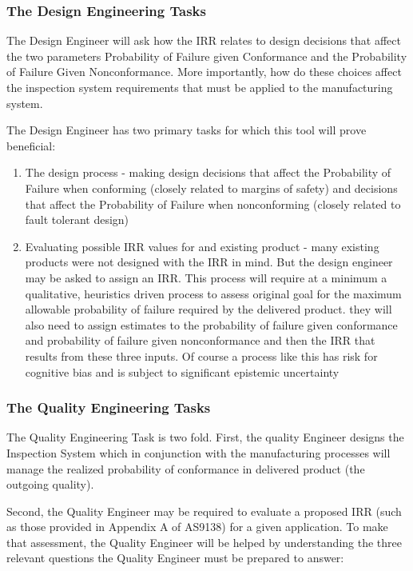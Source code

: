 \documentclass[
]{article}
\providecommand{\tightlist}{%
  \setlength{\itemsep}{0pt}\setlength{\parskip}{0pt}}
\begin{document}
\subsubsection{The Design Engineering Tasks}\label{the-design-engineering-tasks}

The Design Engineer will ask how the IRR relates to design decisions that affect the two parameters Probability of Failure given Conformance and the Probability of Failure Given Nonconformance. More importantly, how do these choices affect the inspection system requirements that must be applied to the manufacturing system.

The Design Engineer has two primary tasks for which this tool will prove beneficial:

\begin{enumerate}
\def\labelenumi{\arabic{enumi}.}
\tightlist
\item
  The design process - making design decisions that affect the Probability of Failure when conforming (closely related to margins of safety) and decisions that affect the Probability of Failure when nonconforming (closely related to fault tolerant design)
\item
  Evaluating possible IRR values for and existing product - many existing products were not designed with the IRR in mind. But the design engineer may be asked to assign an IRR. This process will require at a minimum a qualitative, heuristics driven process to assess original goal for the maximum allowable probability of failure required by the delivered product. they will also need to assign estimates to the probability of failure given conformance and probability of failure given nonconformance and then the IRR that results from these three inputs. Of course a process like this has risk for cognitive bias and is subject to significant epistemic uncertainty
\end{enumerate}

\subsubsection{The Quality Engineering Tasks}\label{the-quality-engineering-tasks}

The Quality Engineering Task is two fold. First, the quality Engineer designs the Inspection System which in conjunction with the manufacturing processes will manage the realized probability of conformance in delivered product (the outgoing quality).

Second, the Quality Engineer may be required to evaluate a proposed IRR (such as those provided in Appendix A of AS9138) for a given application. To make that assessment, the Quality Engineer will be helped by understanding the three relevant questions the Quality Engineer must be prepared to answer:
\end{document}
